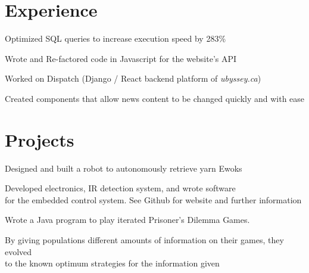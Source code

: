 \documentclass[]{deedy-resume-openfont}
\begin{document}

\section{Experience}

\begin{tightemize}
	\item Optimized SQL queries to increase execution speed by 283\%
	\item Wrote and Re-factored code in Javascript for the website’s API
\end{tightemize}
\sectionsep

\begin{tightemize}
	\item Worked on Dispatch (Django / React backend platform of \textit{ubyssey.ca})
	\item Created components that allow news content to be changed quickly and with ease
\end{tightemize}
\sectionsep

\section{Projects}

\begin{tightemize}
	\item Designed and built a robot to autonomously retrieve yarn Ewoks
	\item Developed electronics, IR detection system, and wrote software \\for the embedded control system. See Github for website and further information
\end{tightemize}
\sectionsep

\begin{tightemize}
	\item Wrote a Java program to play iterated Prisoner's Dilemma Games.
	\item By giving populations different amounts of information on their games, they evolved \\to the known optimum strategies for the information given
\end{tightemize}
\sectionsep
\end{document}
